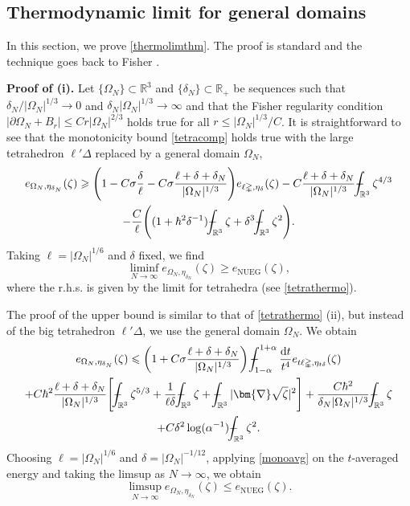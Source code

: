 \documentclass[final,onefignum,onetabnum,reqno]{amsart}
\theoremstyle{remark}
\renewcommand{\le}{\leqslant}
\renewcommand{\ge}{\geqslant}
\newcommand{\RR}{\mathbb{R}}
\newcommand{\NUEG}{\mathrm{NUEG}} %
\newcommand{\grad}{\bm{\nabla}} %
\newcommand{\tetra}{\mathbb{\Delta}} %
\newcommand{\dd}{\mathrm{d}} %
\def\Xint#1{\mathchoice
{\XXint\displaystyle\textstyle{#1}}%
{\XXint\textstyle\scriptstyle{#1}}%
{\XXint\scriptstyle\scriptscriptstyle{#1}}%
{\XXint\scriptscriptstyle\scriptscriptstyle{#1}}%
\!\int}
\def\XXint#1#2#3{{\setbox0=\hbox{$#1{#2#3}{\int}$ }
\vcenter{\hbox{$#2#3$ }}\kern-.6\wd0}}
\def\dashint{\Xint-}
\begin{document}
\subsection{Thermodynamic limit for general domains}
In this section, we prove \cref{thermolimthm}.  The proof is standard and the technique goes back to Fisher \cite{fisher1964free}.

\vspace{.3em}
\noindent\textbf{Proof of (i).} 
Let $\{\Omega_N\}\subset\RR^3$ and $\{\delta_N\}\subset\RR_+$ be sequences such that $\delta_N/|\Omega_N|^{1/3}\to 0$ and $\delta_N|\Omega_N|^{1/3}\to\infty$
and that the Fisher regularity condition $|\partial\Omega_N + B_r|\le Cr|\Omega_N|^{2/3}$ holds true for all $r\le|\Omega_N|^{1/3}/C$. 
It is straightforward to see that the monotonicity bound \cref{tetracomp} holds true with the large tetrahedron $\ell'\tetra$ replaced by a general domain $\Omega_N$,
\begin{multline*}
e_{\Omega_N,\eta_{\delta_N}}(\zeta)\ge \Bigg( 1-C\sigma \frac{\delta}{\ell} -C\sigma\frac{\ell+\delta+\delta_N}{|\Omega_N|^{1/3}}\Bigg) e_{\ell\tetra,\eta_{\delta}}(\zeta)
- C \frac{\ell+\delta+\delta_N}{|\Omega_N|^{1/3}} \dashint_{\RR^3} \zeta^{4/3}\\
-\frac{C}{\ell}\Bigg( (1+\hbar^2\delta^{-1}) \dashint_{\RR^3} \zeta + \delta^3\dashint_{\RR^3} \zeta^2 \Bigg).
\end{multline*}
Taking $\ell=|\Omega_N|^{1/6}$ and $\delta$ fixed, we find
$$
\liminf_{N\to\infty} e_{\Omega_N,\eta_{\delta_N}}(\zeta)\ge e_\NUEG(\zeta),
$$
where the r.h.s. is given by the limit for tetrahedra (see \cref{tetrathermo}).

The proof of the upper bound is similar to that of \cref{tetrathermo} (ii), but instead of the big tetrahedron $\ell'\tetra$, we use the general domain $\Omega_N$. 
We obtain
\begin{multline*}
e_{\Omega_N,\eta_{\delta_N}}(\zeta)\le \left(1+C\sigma\frac{\ell+\delta+\delta_N}{|\Omega_N|^{1/3}}\right)\dashint_{1-\alpha}^{1+\alpha}\frac{\dd t}{t^4} e_{t\ell\tetra,\eta_{t\delta}}(\zeta)\\
+C\hbar^2\frac{\ell+\delta+\delta_N}{|\Omega_N|^{1/3}}\Bigg[ \dashint_{\RR^3} \zeta^{5/3} + \frac{1}{\ell\delta}\dashint_{\RR^3}\zeta + \dashint_{\RR^3} |\grad\sqrt{\zeta}|^2\Bigg] 
+ \frac{C\hbar^2}{\delta_N|\Omega_N|^{1/3}}\dashint_{\RR^3}\zeta\\
+C\delta^2\log(\alpha^{-1}) \dashint_{\RR^3}\zeta^2.
\end{multline*}
Choosing $\ell=|\Omega_N|^{1/6}$ and $\delta=|\Omega_N|^{-1/12}$, applying \cref{monoavg} on the $t$-averaged energy and taking the limsup as $N\to\infty$, we obtain
$$
\limsup_{N\to\infty} e_{\Omega_N,\eta_{\delta_N}}(\zeta)\le e_\NUEG(\zeta).
$$
\end{document}
